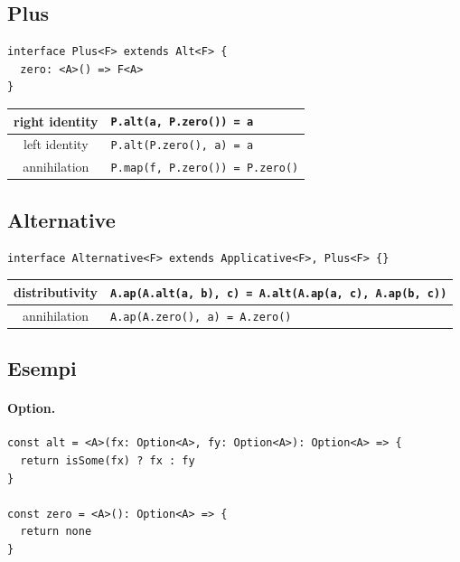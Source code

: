 \documentclass[12pt]{article}
\begin{document}
\subsection{Plus}

\begin{verbatim}
interface Plus<F> extends Alt<F> {
  zero: <A>() => F<A>
}
\end{verbatim}

\begin{center}
\bgroup
\def\arraystretch{1.5}
\begin{tabular}{ |c|p{10cm}| }
\hline
right identity & \texttt{P.alt(a, P.zero()) = a} \\
\hline
left identity & \texttt{P.alt(P.zero(), a) = a} \\
\hline
annihilation & \texttt{P.map(f, P.zero()) = P.zero()} \\
\hline
\end{tabular}
\egroup
\end{center}

\subsection{Alternative}

\begin{verbatim}
interface Alternative<F> extends Applicative<F>, Plus<F> {}
\end{verbatim}

\begin{center}
\bgroup
\def\arraystretch{1.5}
\begin{tabular}{ |c|p{10cm}| }
\hline
distributivity & \texttt{A.ap(A.alt(a, b), c) = A.alt(A.ap(a, c), A.ap(b, c))} \\
\hline
annihilation & \texttt{A.ap(A.zero(), a) = A.zero()} \\
\hline
\end{tabular}
\egroup
\end{center}

\subsection{Esempi}

\paragraph{Option.}

\begin{verbatim}
const alt = <A>(fx: Option<A>, fy: Option<A>): Option<A> => {
  return isSome(fx) ? fx : fy
}

const zero = <A>(): Option<A> => {
  return none
}
\end{verbatim}
\end{document}
